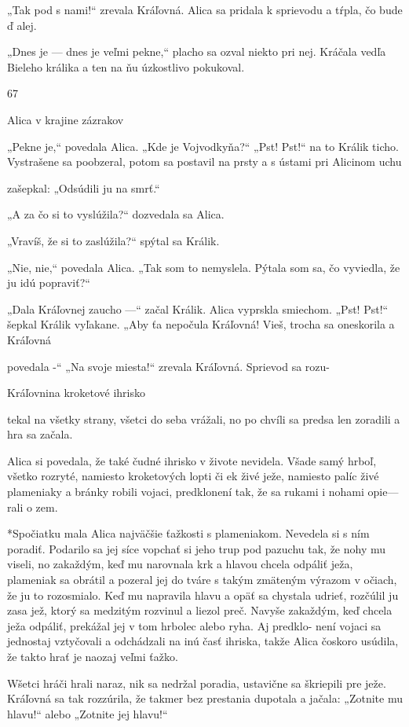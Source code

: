 \documentclass[12pt]{book}
\begin{document}
\begin{Parallel}[p]{}{}
{„Tak pod s nami!“ zrevala Kráľovná. Alica sa pridala
k sprievodu a tŕpla, čo bude ď alej.

„Dnes je — dnes je veľmi pekne,“ placho sa ozval niekto
pri nej. Kráčala vedľa Bieleho králika a ten na ňu úzkostlivo
pokukoval.

67

Alica v krajine zázrakov

„Pekne je,“ povedala Alica. „Kde je Vojvodkyňa?“
„Pst! Pst!“ na to Králik ticho. Vystrašene sa poobzeral,
potom sa postavil na prsty a s ústami pri Alicinom uchu

zašepkal: „Odsúdili ju na smrť.“

„A za čo si to vyslúžila?“ dozvedala sa Alica.

„Vravíš, že si to zaslúžila?“ spýtal sa Králik.

„Nie, nie,“ povedala Alica. „Tak som to nemyslela.
Pýtala som sa, čo vyviedla, že ju idú popraviť?“

„Dala Kráľovnej zaucho —“ začal Králik. Alica vyprskla
smiechom. „Pst! Pst!“ šepkal Králik vyľakane. „Aby ťa
nepočula Kráľovná! Vieš, trocha sa oneskorila a Kráľovná

povedala -“
„Na svoje miesta!“ zrevala Kráľovná. Sprievod sa rozu-

 

Kráľovnina kroketové ihrisko

tekal na všetky strany, všetci do seba vrážali, no po chvíli
sa predsa len zoradili a hra sa začala.

Alica si povedala, že také čudné ihrisko v živote nevidela.
Všade samý hrboľ, všetko rozryté, namiesto kroketových
lopti či ek živé ježe, namiesto palíc živé plameniaky a bránky
robili vojaci, predklonení tak, že sa rukami i nohami opie—
rali o zem.

*Spočiatku mala Alica najväčšie ťažkosti s plameniakom.
Nevedela si s ním poradiť. Podarilo sa jej síce vopchať si jeho
trup pod pazuchu tak, že nohy mu viseli, no zakaždým, keď
mu narovnala krk a hlavou chcela odpáliť ježa, plameniak sa
obrátil a pozeral jej do tváre s takým zmäteným výrazom
v očiach, že ju to rozosmialo. Keď mu napravila hlavu a opäť
sa chystala udrieť, rozčúlil ju zasa jež, ktorý sa medzitým
rozvinul a liezol preč. Navyše zakaždým, keď chcela ježa
odpáliť, prekážal jej v tom hrbolec alebo ryha. Aj predklo-
není vojaci sa jednostaj vztyčovali a odchádzali na inú časť
ihriska, takže Alica čoskoro usúdila, že takto hrať je naozaj
veľmi ťažko.

Wšetci hráči hrali naraz, nik sa nedržal poradia, ustavične
sa škriepili pre ježe. Kráľovná sa tak rozzúrila, že takmer bez
prestania dupotala a jačala: „Zotnite mu hlavu!“ alebo
„Zotnite jej hlavu!“

}
\end{Parallel}
\end{document}

